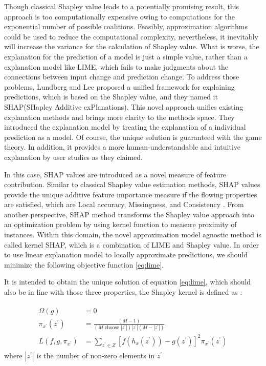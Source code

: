 Though classical Shapley value leads to a potentially promising result, this approach is too computationally expensive owing to computations for the exponential number of possible coalitions. Feasibly, approximation algorithms could be used to reduce the computational complexity, nevertheless, it inevitably will increase the variance for the calculation of Shapley value. What is worse, the explanation for the prediction of a model is just a simple value, rather than a explanation model like LIME, which fails to make judgments about the connections between input change and prediction change. To address those problems, Lundberg and Lee \cite{lundberg2017unified} proposed a unified framework for explaining predictions, which is based on the Shapley value, and they named it SHAP(SHapley Additive exPlanations). This novel approach unifies existing explanation methods and brings more clarity to the methods space. They introduced the explanation model by treating the explanation of a individual prediction as a model. Of course, the unique solution is guaranteed with the game theory. In addition, it provides a more human-understandable and intuitive explanation by user studies as they claimed. 

In this case, SHAP values are introduced as a novel measure of feature contribution. Similar to classical Shapley value estimation methods, SHAP values provide the unique additive feature importance measure if the flowing properties are satisfied, which are Local accuracy, Missingness, and Consistency \cite{lundberg2017unified}. From another perspective, SHAP method transforms the Shapley value approach into an optimization problem by using kernel function to measure proximity of instances. Within this domain, the novel approximation model agnostic method is called kernel SHAP, which is a combination of LIME and Shapley value. In order to use linear explanation model to locally approximate predictions, we should minimize the following objective function \ref{eq:lime}. 

It is intended to obtain the unique solution of equation \ref{eq:lime}, which should also be in line with those three properties, the Shapley kernel is defined as \cite{lundberg2017unified}:

\begin{equation} \label{eq:shap_kernel}
\begin{gathered}
\begin{aligned} \Omega(g) &=0 \\ \pi_{x^{\prime}}\left(z^{\prime}\right) &=\frac{(M-1)}{\left(M \text { choose }\left|z^{\prime}\right|\right)\left|z^{\prime}\right|\left(M-\left|z^{\prime}\right|\right)} \\ L\left(f, g, \pi_{x^{\prime}}\right) &=\sum_{z^{\prime} \in Z}\left[f\left(h_{x}\left(z^{\prime}\right)\right)-g\left(z^{\prime}\right)\right]^{2} \pi_{x^{\prime}}\left(z^{\prime}\right) \end{aligned}
\end{gathered}
\end{equation}
where $|z^\prime|$ is the number of non-zero elements in $z^\prime$

